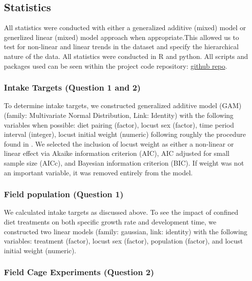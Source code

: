 \documentclass[
]{article}
\begin{document}
\subsection{Statistics}\label{statistics}

All statistics were conducted with either a generalized additive (mixed)
model or generlized linear (mixed) model approach when appropriate.This
allowed us to test for non-linear and linear trends in the dataset and
specify the hierarchical nature of the data. All statistics were
conducted in R and python. All scripts and packages used can be seen
within the project code repository:
\href{https://github.com/ddlawton/herbivore_nutrient_interactions}{github
repo}.

\subsubsection{Intake Targets (Question 1 and
2)}\label{intake-targets-question-1-and-2}

To determine intake targets, we constructed generalized additive model
(GAM) (family: Multivariate Normal Distribution, Link: Identity) with
the following variables when possible: diet pairing (factor), locust sex
(factor), time period interval (integer), locust initial weight
(numeric) following roughly the procedure found in
\citet{lawton_mismatched_2021}. We selected the inclusion of locust
weight as either a non-linear or linear effect via Akaike information
criterion (AIC), AIC adjusted for small sample size (AICc), and Bayesian
information criterion (BIC). If weight was not an important variable, it
was removed entirely from the model.

\subsubsection{Field population (Question
1)}\label{field-population-question-1}

We calculated intake targets as discussed above. To see the impact of
confined diet treatments on both specific growth rate and development
time, we constructed two linear models (family: gaussian, link:
identity) with the following variables: treatment (factor), locust sex
(factor), population (factor), and locust initial weight (numeric).

\subsubsection{Field Cage Experiments (Question
2)}\label{field-cage-experiments-question-2-1}
\end{document}

